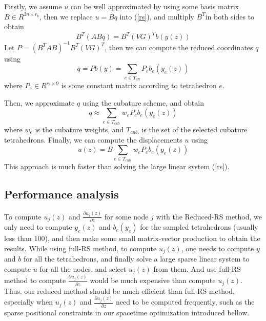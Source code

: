 \documentclass[9pt,twocolumn]{extarticle}
\begin{document}
Firstly, we assume $u$ can be well approximated by using some basis matrix $B\in
R^{3n\times r_b}$, then we replace $u = Bq$ into (\ref{rs}), and multiply
$B^T$in both sides to obtain
\begin{equation} \label{reduced_rs1} B^T(ABq) = B^T(VG)^Tb(y(z))
\end{equation} Let $P = (B^TAB)^{-1}B^T(VG)^T$, then we can compute the reduced
coordinates $q$ using
\begin{equation} \label{reduced_rs2} 
  q = Pb(y) = \sum_{e\in{T_{all}}}P_e{b_e(y_e(z))}
\end{equation} where $P_e\in R^{r_b\times 9}$ is some constant matrix according
to tetrahedron $e$.

Then, we approximate $q$ using the cubature scheme, and obtain
\begin{equation} \label{reduced_rs3} 
  q \approx \sum_{e\in{T_{cub.}}}w_eP_e{b_e(y_e(z))}
\end{equation} 
where $w_e$ is the cubature weights, and $T_{cub.}$ is the set of the selected
cubature tetrahedrons. Finally, we can compute the displacements $u$ using
\begin{equation} \label{reduced_rs4}
  u(z) = B \sum_{e\in{T_{cub.}}}w_eP_e{b_e(y_e(z))}
\end{equation} 
This approach is much faster than solving the large linear system (\ref{rs}).

\subsection{Performance analysis} 
To compute $u_j(z)$ and $\frac{\partial{u_j(z)}}{\partial{z}}$ for some node $j$
with the Reduced-RS method, we only need to compute $y_e(z)$ and $b_e(y_e)$ for
the sampled tetrahedrons (usually less than 100), and then make some small
matrix-vector production to obtain the results. While using full-RS method, to
compute $u_j(z)$, one needs to compute $y$ and $b$ for all the tetrahedrons, and
finally solve a large sparse linear system to compute $u$ for all the nodes, and
select $u_j(z)$ from them. And use full-RS method to compute
$\frac{\partial{u_j(z)}}{\partial{z}}$ would be much expensive than compute
$u_j(z)$. Thus, our reduced method should be much efficient than full-RS method,
especially when $u_j(z)$ and $\frac{\partial{u_j(z)}}{\partial{z}}$ need to be
computed frequently, such as the sparse positional constraints in our spacetime
optimization introduced bellow.
\end{document}

